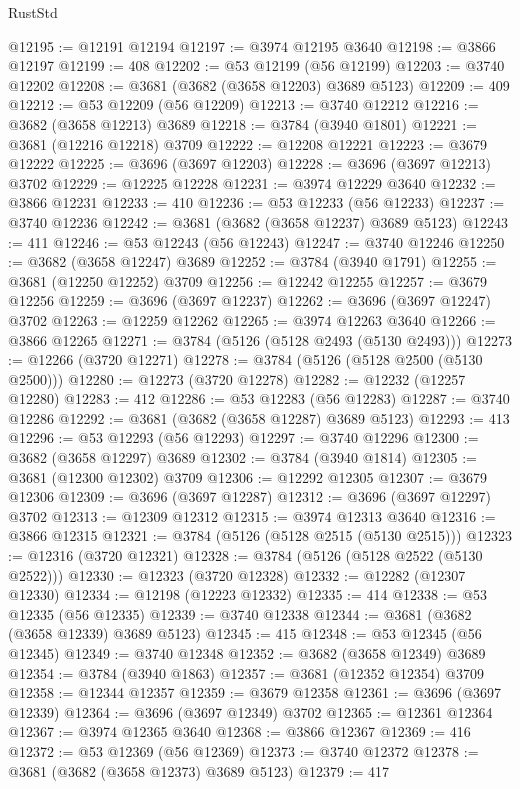 \begin{lexlean}{RustStd}
\begin{coremodule}
@12195 := @12191 @12194
@12197 := @3974 @12195 @3640
@12198 := @3866 @12197
@12199 := 408
@12202 := @53 @12199 (@56 @12199)
@12203 := @3740 @12202
@12208 := @3681 (@3682 (@3658 @12203) @3689 @5123)
@12209 := 409
@12212 := @53 @12209 (@56 @12209)
@12213 := @3740 @12212
@12216 := @3682 (@3658 @12213) @3689
@12218 := @3784 (@3940 @1801)
@12221 := @3681 (@12216 @12218) @3709
@12222 := @12208 @12221
@12223 := @3679 @12222
@12225 := @3696 (@3697 @12203)
@12228 := @3696 (@3697 @12213) @3702
@12229 := @12225 @12228
@12231 := @3974 @12229 @3640
@12232 := @3866 @12231
@12233 := 410
@12236 := @53 @12233 (@56 @12233)
@12237 := @3740 @12236
@12242 := @3681 (@3682 (@3658 @12237) @3689 @5123)
@12243 := 411
@12246 := @53 @12243 (@56 @12243)
@12247 := @3740 @12246
@12250 := @3682 (@3658 @12247) @3689
@12252 := @3784 (@3940 @1791)
@12255 := @3681 (@12250 @12252) @3709
@12256 := @12242 @12255
@12257 := @3679 @12256
@12259 := @3696 (@3697 @12237)
@12262 := @3696 (@3697 @12247) @3702
@12263 := @12259 @12262
@12265 := @3974 @12263 @3640
@12266 := @3866 @12265
@12271 := @3784 (@5126 (@5128 @2493 (@5130 @2493)))
@12273 := @12266 (@3720 @12271)
@12278 := @3784 (@5126 (@5128 @2500 (@5130 @2500)))
@12280 := @12273 (@3720 @12278)
@12282 := @12232 (@12257 @12280)
@12283 := 412
@12286 := @53 @12283 (@56 @12283)
@12287 := @3740 @12286
@12292 := @3681 (@3682 (@3658 @12287) @3689 @5123)
@12293 := 413
@12296 := @53 @12293 (@56 @12293)
@12297 := @3740 @12296
@12300 := @3682 (@3658 @12297) @3689
@12302 := @3784 (@3940 @1814)
@12305 := @3681 (@12300 @12302) @3709
@12306 := @12292 @12305
@12307 := @3679 @12306
@12309 := @3696 (@3697 @12287)
@12312 := @3696 (@3697 @12297) @3702
@12313 := @12309 @12312
@12315 := @3974 @12313 @3640
@12316 := @3866 @12315
@12321 := @3784 (@5126 (@5128 @2515 (@5130 @2515)))
@12323 := @12316 (@3720 @12321)
@12328 := @3784 (@5126 (@5128 @2522 (@5130 @2522)))
@12330 := @12323 (@3720 @12328)
@12332 := @12282 (@12307 @12330)
@12334 := @12198 (@12223 @12332)
@12335 := 414
@12338 := @53 @12335 (@56 @12335)
@12339 := @3740 @12338
@12344 := @3681 (@3682 (@3658 @12339) @3689 @5123)
@12345 := 415
@12348 := @53 @12345 (@56 @12345)
@12349 := @3740 @12348
@12352 := @3682 (@3658 @12349) @3689
@12354 := @3784 (@3940 @1863)
@12357 := @3681 (@12352 @12354) @3709
@12358 := @12344 @12357
@12359 := @3679 @12358
@12361 := @3696 (@3697 @12339)
@12364 := @3696 (@3697 @12349) @3702
@12365 := @12361 @12364
@12367 := @3974 @12365 @3640
@12368 := @3866 @12367
@12369 := 416
@12372 := @53 @12369 (@56 @12369)
@12373 := @3740 @12372
@12378 := @3681 (@3682 (@3658 @12373) @3689 @5123)
@12379 := 417

\end{coremodule}
\end{lexlean}

